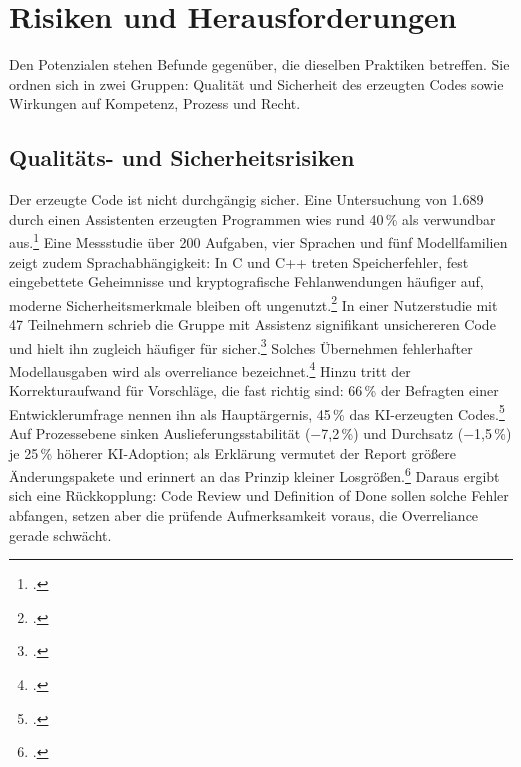\section{Risiken und Herausforderungen}\label{sec:risiken}
Den Potenzialen stehen Befunde gegenüber, die dieselben Praktiken betreffen. Sie ordnen sich in zwei Gruppen: Qualität und Sicherheit des erzeugten Codes sowie Wirkungen auf Kompetenz, Prozess und Recht.

\subsection{Qualitäts- und Sicherheitsrisiken}\label{subsec:qualitaetsrisiken}
Der erzeugte Code ist nicht durchgängig sicher. Eine Untersuchung von 1.689 durch einen Assistenten erzeugten Programmen wies rund 40\,\% als verwundbar aus.\footcite[\vglf][]{Pearce.2022} Eine Messstudie über 200 Aufgaben, vier Sprachen und fünf Modellfamilien zeigt zudem Sprachabhängigkeit: In C und C++ treten Speicherfehler, fest eingebettete Geheimnisse und kryptografische Fehlanwendungen häufiger auf, moderne Sicherheitsmerkmale bleiben oft ungenutzt.\footcite[\vglf][]{Kharma.2026} In einer Nutzerstudie mit 47 Teilnehmern schrieb die Gruppe mit Assistenz signifikant unsichereren Code und hielt ihn zugleich häufiger für sicher.\footcite[\vglf][]{Perry.2023} Solches Übernehmen fehlerhafter Modellausgaben wird als \gls{overreliance} bezeichnet.\footcite[\vglf][]{Shen.2026} Hinzu tritt der Korrekturaufwand für Vorschläge, die fast richtig sind: 66\,\% der Befragten einer Entwicklerumfrage nennen ihn als Hauptärgernis, 45\,\% das  KI-erzeugten Codes.\footcite[\vglf][]{Swaraj.2026} Auf Prozessebene sinken Auslieferungsstabilität ($-$7,2\,\%) und Durchsatz ($-$1,5\,\%) je 25\,\% höherer KI-Adoption; als Erklärung vermutet der Report größere Änderungspakete und erinnert an das Prinzip kleiner Losgrößen.\footcite[\vglf][ f.]{DORA.2024} Daraus ergibt sich eine Rückkopplung: Code Review und Definition of Done sollen solche Fehler abfangen, setzen aber die prüfende Aufmerksamkeit voraus, die Overreliance gerade schwächt.

